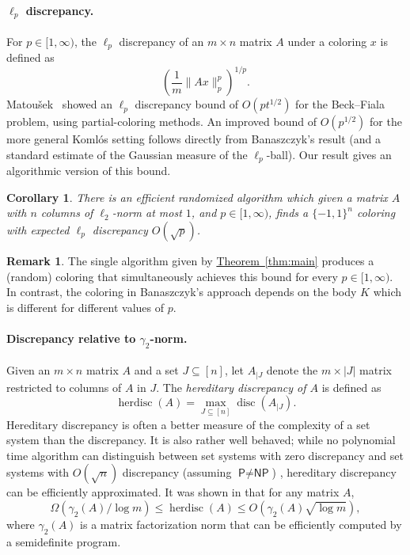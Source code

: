 \documentclass[11pt]{article}
\numberwithin{equation}{section}
\newtheorem{corollary}[theorem]{Corollary}
\theoremstyle{definition}
\newtheorem{remark}[theorem]{Remark}
\theoremstyle{plain}
\newcommand{\cclass}[1]{\textsf{#1}}
\newcommand{\expref}[2]{\hyperref[#2]{#1~\ref{#2}}}
\DeclareMathOperator{\disc}{disc}   %
\DeclareMathOperator{\herdisc}{herdisc}   %
\begin{document}
\paragraph{$\ell_p$ discrepancy.} For $p\in[1,\infty)$, the $\ell_p$ discrepancy of an $m\times n$ matrix $A$ under a coloring $x$ is defined as
\[
  \left( \frac{1}{m} \| Ax\|_p^p \right)^{1/p}.
\]
Matou\v{s}ek~\cite{matouseklp} showed an $\ell_p$ discrepancy bound of
$O(p t^{1/2})$ for the Beck--Fiala problem, using partial-coloring
methods. An improved bound of $O(p^{1/2})$ for the more general
Koml\'os setting follows directly from Banaszczyk's result (and a
standard estimate of the Gaussian measure of the $\ell_p$-ball). Our
result gives an algorithmic version of this bound.
\begin{corollary}
\label{thm:lpdiscrepancy}
There is an efficient randomized algorithm which
given a matrix $A$ with $n$ columns of $\ell_2$-norm at most $1$, and $p\in [1,\infty)$, finds a $\{-1,1\}^n$  coloring
with expected $\ell_p$ discrepancy $O(\sqrt{p})$.
\end{corollary}

\begin{remark}
 The single algorithm given by \expref{Theorem}{thm:main} produces a (random) coloring that simultaneously achieves this bound for every $p\in[1,\infty)$.
In contrast, the coloring in Banaszczyk's approach depends on the body $K$ which is different for different values of $p$.
\end{remark}

\paragraph{Discrepancy relative to $\gamma_2$-norm.} Given an $m\times n$ matrix $A$ and a set $J\subseteq [n]$, let $A_{|J}$ denote the $m\times |J|$ matrix restricted to columns of $A$ in $J$. The
\textit{hereditary discrepancy of $A$} is defined as
\[ \herdisc(A) = \max_{J\subseteq[n]}\disc(A_{|J}).\]
Hereditary discrepancy is often a better measure of the complexity of a set system than the discrepancy. It is also rather well behaved; while no polynomial time algorithm can distinguish between set systems with zero discrepancy and set systems with $O(\sqrt{n})$ discrepancy (assuming $\cclass{P} \neq \cclass{NP}$) \cite{CNN11}, hereditary discrepancy can be efficiently approximated. It was shown in \cite{MNT14} that for any matrix $A$,
\begin{equation}
\label{eqn:herdisc}
 \Omega(\gamma_2(A)/\log m)\le \herdisc(A) \le O(\gamma_2(A)\sqrt{\log m}),
 \end{equation}
where $\gamma_2(A)$ is a matrix factorization norm that can be efficiently computed by a semidefinite program.
\end{document}
